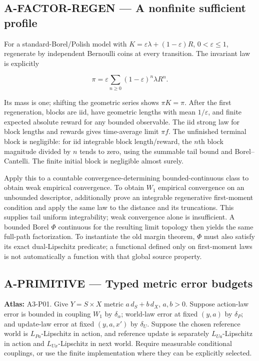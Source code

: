 \documentclass[
  11pt,
  a4paper,
]{article}
\begin{document}
\subsection{A-FACTOR-REGEN --- A nonfinite sufficient
profile}\label{a-factor-regen-a-nonfinite-sufficient-profile}

For a standard-Borel/Polish model with
\(K=\varepsilon\lambda+(1-\varepsilon)R\), \(0<\varepsilon\le1\),
regenerate by independent Bernoulli coins at every transition. The
invariant law is explicitly

\[\pi=\varepsilon\sum_{n\ge0}(1-\varepsilon)^n\lambda R^n.\]

Its mass is one; shifting the geometric series shows \(\pi K=\pi\).
After the first regeneration, blocks are iid, have geometric lengths
with mean \(1/\varepsilon\), and finite expected absolute reward for any
bounded observable. The iid strong law for block lengths and rewards
gives time-average limit \(\pi f\). The unfinished terminal block is
negligible: for iid integrable block length/reward, the \(n\)th block
magnitude divided by \(n\) tends to zero, using the summable tail bound
and Borel--Cantelli. The finite initial block is negligible almost
surely.

Apply this to a countable convergence-determining bounded-continuous
class to obtain weak empirical convergence. To obtain \(W_1\) empirical
convergence on an unbounded descriptor, additionally prove an integrable
regenerative first-moment condition and apply the same law to the
distance and its truncations. This supplies tail uniform integrability;
weak convergence alone is insufficient. A bounded Borel \(\Phi\)
continuous for the resulting limit topology then yields the same
full-path factorization. To instantiate the old margin theorem, \(\Phi\)
must also satisfy its exact dual-Lipschitz predicate; a functional
defined only on first-moment laws is not automatically a function with
that global source property.

\subsection{A-PRIMITIVE --- Typed metric error
budgets}\label{a-primitive-typed-metric-error-budgets}

\textbf{Atlas:} A3-P01. Give \(Y=S\times X\) metric \(a\,d_S+b\,d_X\),
\(a,b>0\). Suppose action-law error is bounded in coupling \(W_1\) by
\(\delta_\alpha\); world-law error at fixed \((y,a)\) by \(\delta_P\);
and update-law error at fixed \((y,a,x')\) by \(\delta_U\). Suppose the
chosen reference world is \(L_{Pa}\)-Lipschitz in action, and reference
update is separately \(L_{Ua}\)-Lipschitz in action and
\(L_{Ux}\)-Lipschitz in next world. Require measurable conditional
couplings, or use the finite implementation where they can be explicitly
selected.
\end{document}
